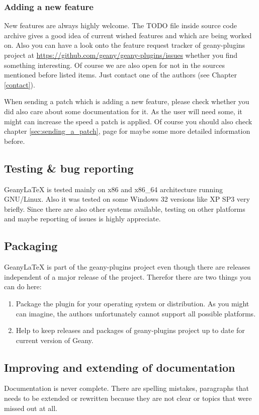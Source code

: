 \documentclass[%
paper=a4,%
fontsize=11pt,%
twoside=false,%
DIV18,%
headsepline,%
plainheadsepline,%
footsepline,%
plainfootsepline,%
bibliography=totoc,%
listof=totoc,%
BCOR10mm,%
parskip=half,%
openany,%
]{scrartcl}
\begin{document}
\subsubsection{Adding a new feature}
New features are always highly welcome. The TODO file inside source
code archive gives a good idea of current wished features and which
are being worked on. Also you can have a look onto the feature request
tracker of geany-plugins project at
\url{https://github.com/geany/geany-plugins/issues} whether you find
something interesting. Of course we are also open for not in the
sources mentioned before listed items. Just contact one of the authors
(see Chapter \ref{contact}).

When sending a patch which is adding a new feature, please check
whether you did also care about some documentation for it. As the
user will need some, it might can increase the speed a patch is
applied. Of course you should also check chapter \ref{sec:sending_a_patch},
page \pageref{sec:sending_a_patch} for maybe some more detailed
information before.

\subsection{Testing \& bug reporting} Geany\LaTeX{} is tested mainly
on x86 and x86\_64 architecture running GNU/Linux. Also it was
tested on some Windows 32 versions like XP SP3 very briefly. Since
there are also other systems available, testing on other platforms
and maybe reporting of issues is highly appreciate.

\subsection{Packaging}
Geany\LaTeX{} is part of the geany-plugins project even though there
are releases independent of a major release of the project. Therefor
there are two things you can do here:
\begin{enumerate}
	\item Package the plugin for your operating system or
	distribution. As you might can imagine, the authors unfortunately
	cannot support all possible platforms.
	\item Help to keep releases and packages of geany-plugins project
	up to date for current version of Geany.
\end{enumerate}


\subsection{Improving and extending of documentation}
Documentation is never complete. There are spelling mistakes,
paragraphs that needs to be extended or rewritten because they are not
clear or topics that were missed out at all.
\end{document}
